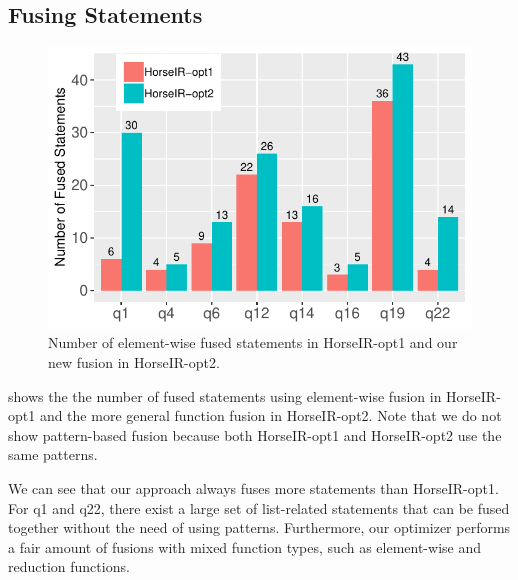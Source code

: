 




\subsection{Fusing Statements}

\begin{figure}[htbp]
\centering
\includegraphics[width=.85\columnwidth]{./src/figure/bar-number.pdf}
\caption{Number of element-wise fused statements in HorseIR-opt1 and our new fusion in HorseIR-opt2.}
\label{fig:opt_number}
\end{figure}

 shows the the number of fused statements using
element-wise fusion in HorseIR-opt1 and the more general function fusion in
HorseIR-opt2.  Note that we do not show pattern-based fusion because both
HorseIR-opt1 and HorseIR-opt2 use the same patterns. 

We can see that our approach always fuses more statements than HorseIR-opt1.
For q1 and q22, there exist a large set of list-related statements that can be
fused together without the need of using patterns.  Furthermore, our optimizer
performs a fair amount of fusions with mixed function types, such as
element-wise and reduction functions. 

